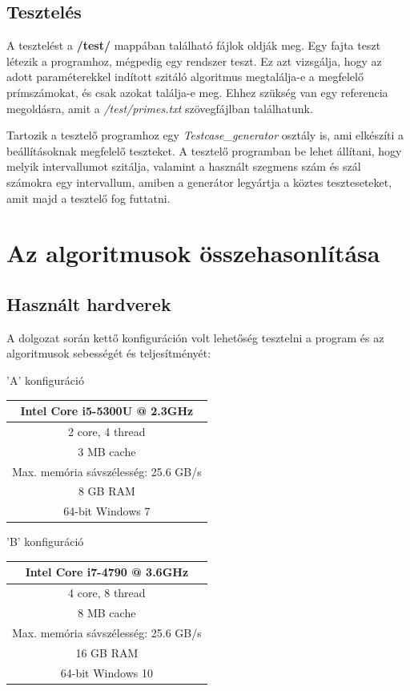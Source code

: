 \documentclass[twoside, a4paper, 12pt]{article}
\begin{document}
\subsection{Tesztelés} \label{test}

A tesztelést a \textbf{/test/} mappában található fájlok oldják meg. Egy fajta teszt létezik a programhoz, mégpedig egy rendszer teszt. Ez azt vizsgálja, hogy az adott paraméterekkel indított szitáló algoritmus megtalálja-e a megfelelő prímszámokat, és csak azokat találja-e meg. Ehhez szükség van egy referencia megoldásra, amit a \textit{/test/primes.txt} szövegfájlban találhatunk. \par
 Tartozik a tesztelő programhoz egy \textit{Testcase\_generator} osztály is, ami elkészíti a beállításoknak megfelelő teszteket. A tesztelő programban be lehet állítani, hogy melyik intervallumot szitálja, valamint a használt szegmens szám és szál számokra egy intervallum, amiben a generátor legyártja a köztes teszteseteket, amit majd a tesztelő fog futtatni.

\clearpage
\section{Az algoritmusok összehasonlítása}

\subsection{Használt hardverek}

A dolgozat során kettő konfiguráción volt lehetőség tesztelni a program és az algoritmusok sebességét és teljesítményét: \bigskip \bigskip \bigskip

'A' konfiguráció ~~~~~~~~
\begin{tabular}{ | c | }
  \hline
  Intel Core i5-5300U @ 2.3GHz \\ \hline
  2 core, 4 thread \\ \hline
  3 MB cache \\ \hline
  Max. memória sávszélesség: 25.6 GB/s \\ \hline
  8 GB RAM\\ \hline
  64-bit Windows 7 \\
  \hline
\end{tabular}

\bigskip \bigskip

'B' konfiguráció ~~~~~~~~
\begin{tabular}{ | c | }
  \hline
  Intel Core i7-4790 @ 3.6GHz \\ \hline
  4 core, 8 thread \\ \hline
  8 MB cache \\ \hline
  Max. memória sávszélesség: 25.6 GB/s \\ \hline
  16 GB RAM\\ \hline
  64-bit Windows 10 \\
  \hline
\end{tabular}
\end{document}
